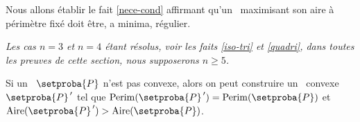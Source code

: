 Nous allons établir le fait \ref{nece-cond} affirmant qu'un \ngone\ maximisant son aire à périmètre fixé doit être, a minima, régulier.


\begin{tcolorbox}
	\itshape\small
	Les cas $n = 3$ et $n = 4$ étant résolus, voir les faits \ref{iso-tri} et \ref{quadri}, dans toutes les preuves de cette section, nous supposerons $n \geq 5 $.
\end{tcolorbox}




\begin{fact} \label{conv-poly}
	Si un \ngone\ $\setproba{P}$ n'est pas convexe, alors on peut construire un \ngone\ convexe $\setproba{P}^{\,\prime}$ tel que
	$\perim{\setproba{P}^{\,\prime}} = \perim{\setproba{P}}$
	et
	$\area{\setproba{P}^{\,\prime}} > \area{\setproba{P}}$.
\end{fact}


